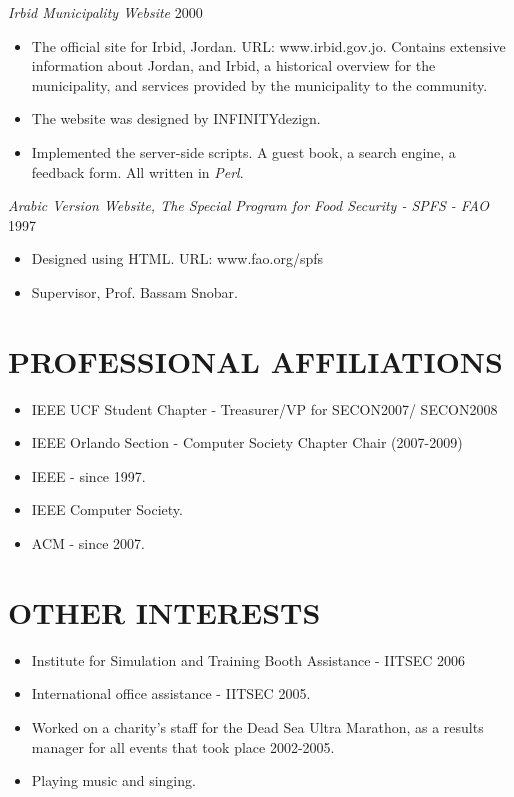 \documentclass[line,margin]{res}
\begin{document}
\begin{resume}
{\sl Irbid Municipality Website} \hfill   2000 \\
\begin{itemize} \itemsep -2pt
     \item The official site for Irbid, Jordan. URL: www.irbid.gov.jo.
     Contains extensive information about Jordan, and Irbid, a historical
     overview for the municipality, and services provided by the municipality
     to the community.
     \item The website was designed by INFINITYdezign.
     \item Implemented the server-side scripts. A guest book, a search engine,
     a feedback form. All written in \textit{Perl}.
\end{itemize}

{\sl Arabic Version Website, The Special Program for Food Security - SPFS - FAO}
\hfill   1997 \\
\begin{itemize} \itemsep -2pt
     \item Designed using HTML. URL: www.fao.org/spfs
     \item Supervisor, Prof. Bassam Snobar.
\end{itemize}

\section{PROFESSIONAL AFFILIATIONS}
\begin{itemize} \itemsep -2pt
     \item IEEE UCF Student Chapter - Treasurer/VP for SECON2007/ SECON2008
     \item IEEE Orlando Section  - Computer Society Chapter Chair (2007-2009)
     \item IEEE - since 1997.
     \item IEEE Computer Society.
     \item ACM - since 2007.
\end{itemize}

\section{OTHER INTERESTS}
\begin{itemize} \itemsep -2pt
     \item Institute for Simulation and Training Booth Assistance - IITSEC 2006
     \item International office assistance - IITSEC 2005.
     \item Worked on a charity's staff for the Dead Sea Ultra Marathon, as a
     results manager for all events that took place 2002-2005.
     \item Playing music and singing.
\end{itemize}


\end{resume}
\end{document}
